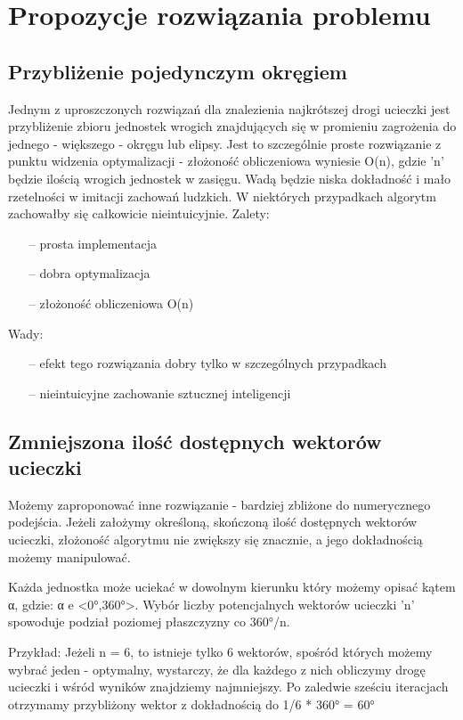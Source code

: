 \documentclass[12pt]{report}
\begin{document}
\section{Propozycje rozwiązania problemu}
\subsection{Przybliżenie pojedynczym okręgiem}
Jednym z uproszczonych rozwiązań dla znalezienia najkrótszej drogi ucieczki jest przybliżenie zbioru jednostek wrogich znajdujących się w promieniu zagrożenia do jednego - większego - okręgu lub elipsy. Jest to szczególnie proste rozwiązanie z punktu widzenia optymalizacji - złożoność obliczeniowa wyniesie O(n), gdzie 'n' będzie ilością wrogich jednostek w zasięgu. Wadą będzie niska dokładność i mało rzetelności w imitacji zachowań ludzkich. W niektórych przypadkach algorytm zachowałby się całkowicie nieintuicyjnie.
Zalety:
\begin{itemize}
\item[--] prosta implementacja
\item[--] dobra optymalizacja
\item[--] złożoność obliczeniowa O(n) 
\end{itemize}
Wady:
\begin{itemize}
\item[--] efekt tego rozwiązania dobry tylko w szczególnych przypadkach
\item[--] nieintuicyjne zachowanie sztucznej inteligencji
\end{itemize}

\subsection{Zmniejszona ilość dostępnych wektorów ucieczki}
Możemy zaproponować inne rozwiązanie - bardziej zbliżone do numerycznego podejścia. Jeżeli założymy określoną, skończoną ilość dostępnych wektorów ucieczki, złożoność algorytmu nie zwiększy się znacznie, a jego dokładnością możemy manipulować. 

Każda jednostka może uciekać w dowolnym kierunku który możemy opisać kątem α, gdzie:
α e <0°,360°>.
Wybór liczby potencjalnych wektorów ucieczki 'n' spowoduje podział poziomej płaszczyzny co 360°/n.

Przykład:
Jeżeli n = 6, to istnieje tylko 6 wektorów, spośród których możemy wybrać jeden - optymalny, wystarczy, że dla każdego z nich obliczymy drogę ucieczki i wśród wyników znajdziemy najmniejszy. Po zaledwie sześciu iteracjach otrzymamy przybliżony wektor z dokładnością do 1/6 * 360° = 60°
\end{document}
